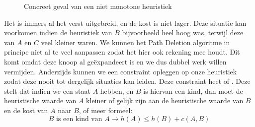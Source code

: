 \begin{figure}[htb]
\centering
{}
\caption{Concreet geval van een niet monotone heuristiek}
\label{fig:badMonotonicity}
\end{figure}
Het is immers al het verst uitgebreid, en de kost is niet lager. Deze situatie kan voorkomen indien de heuristiek van $B$ bijvoorbeeld heel hoog was, terwijl deze van $A$ en $C$ veel kleiner waren. We kunnen het Path Deletion algoritme in principe niet al te veel aanpassen zodat het hier ook rekening mee houdt. Dit komt omdat deze knoop al ge\"expandeert is en we dus dubbel werk willen vermijden. Anderzijds kunnen we een constraint opleggen op onze heuristiek zodat deze nooit tot dergelijk situaties kan leiden. Deze constraint heet  of . Deze stelt dat indien we een staat $A$ hebben, en $B$ is hiervan een kind, dan moet de heuristische waarde van $A$ kleiner of gelijk zijn aan de heuristische waarde van $B$ en de kost van $A$ naar $B$, of meer formeel:
\begin{equation}
B\mbox{ is een kind van }A\rightarrow h\left(A\right)\leq h\left(B\right)+c\left(A,B\right)
\end{equation}
